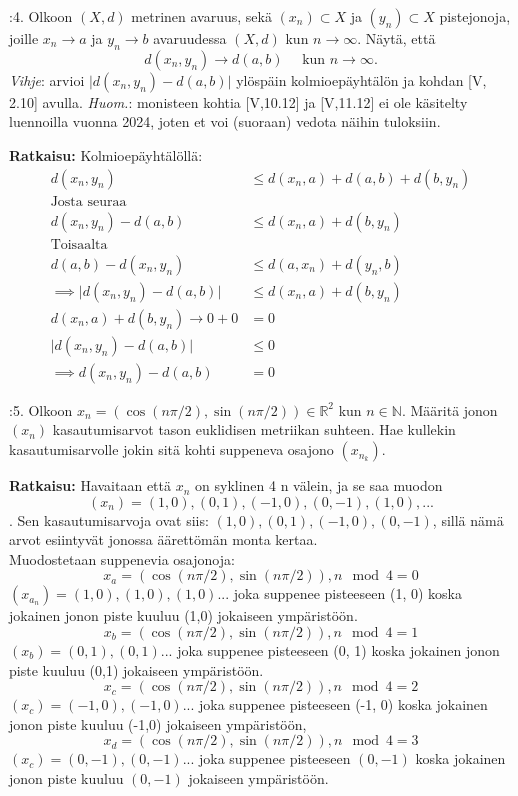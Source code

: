 \documentclass[12pt,a4paper,leqno]{amsart}
\begin{document}
\bigskip

:4. Olkoon $(X,d)$ metrinen avaruus, sekä $(x_n) \subset X$ ja $(y_n) \subset X$
pistejonoja, joille $x_n \to a$ ja $y_n \to b$ avaruudessa $(X,d)$ kun
$n \to \infty$. Näytä, että 
\[
d(x_n,y_n) \to d(a,b)  \quad \textrm{ kun } n \to \infty.
\]
\textit{Vihje}: arvioi $\vert d(x_n,y_n) - d(a,b)\vert$ ylöspäin kolmioepäyhtälön  ja kohdan [V, 2.10] avulla. 
\textit{Huom.}: monisteen kohtia [V,10.12] ja [V,11.12] ei ole käsitelty luennoilla vuonna 2024, joten et voi (suoraan) vedota näihin tuloksiin.

\textbf{Ratkaisu: }
Kolmioepäyhtälöllä:
\begin{align*}
    d(x_n, y_n) &\leq d(x_n, a) + d(a, b) + d(b, y_n) \\
    \text{Josta seuraa} \\
    d(x_n, y_n) - d(a, b) &\leq d(x_n, a) + d(b, y_n) \\
    \text{Toisaalta} \\
    d(a, b) - d(x_n, y_n) &\leq d(a, x_n) + d(y_n, b) \\
    \implies \vert d(x_n,y_n) - d(a,b)\vert &\leq d(x_n, a) + d(b, y_n) \\
    d(x_n, a) + d(b, y_n) \rightarrow 0 + 0 &= 0 \\
    \vert d(x_n,y_n) - d(a,b)\vert &\leq 0 \\
    \implies d(x_n,y_n) - d(a,b) &= 0
\end{align*}

\bigskip

:5. Olkoon $x_n = (\cos (n\pi/2), \sin (n\pi/2)) \in \mathbb R^2$
kun $n \in \mathbb N$. Määritä jonon $(x_n)$ kasautumis\-arvot tason euklidisen metriikan suhteen. Hae kullekin kasautumis\-arvolle
jokin sitä kohti suppeneva osajono $(x_{n_{k}})$.

\textbf{Ratkaisu: }
Havaitaan että $x_n$ on syklinen 4 n välein, ja se saa muodon 
\[(x_n) = (1, 0), (0, 1), (-1, 0), (0, -1), (1, 0), ...\]. Sen kasautumisarvoja ovat siis: $(1, 0), (0, 1), (-1, 0), (0, -1)$, sillä nämä arvot esiintyvät jonossa äärettömän monta kertaa.
\\
Muodostetaan suppenevia osajonoja:
\[x_{a} = (\cos (n\pi/2), \sin (n\pi/2)), n \mod 4 = 0\]
$(x_{a_n}) = (1, 0), (1, 0), (1, 0) ...$ joka suppenee pisteeseen (1, 0) koska jokainen jonon piste kuuluu (1,0) jokaiseen ympäristöön.
\\
\[x_{b} = (\cos (n\pi/2), \sin (n\pi/2)), n \mod 4 = 1\]
$(x_{b}) = (0, 1), (0, 1) ...$ joka suppenee pisteeseen (0, 1) koska jokainen jonon piste kuuluu (0,1) jokaiseen ympäristöön.
\\
\[x_{c} = (\cos (n\pi/2), \sin (n\pi/2)), n \mod 4 = 2\]
$(x_{c}) = (-1, 0), (-1, 0) ...$ joka suppenee pisteeseen (-1, 0) koska jokainen jonon piste kuuluu (-1,0) jokaiseen ympäristöön,
\\
\[x_{d} = (\cos (n\pi/2), \sin (n\pi/2)), n \mod 4 = 3\]
$(x_{c}) = (0, -1), (0, -1) ...$ joka suppenee pisteeseen $(0, -1)$ koska jokainen jonon piste kuuluu $(0, -1)$ jokaiseen ympäristöön.
\end{document}
